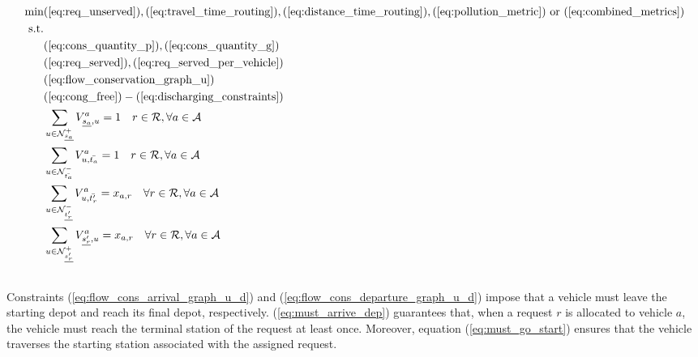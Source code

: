 \begin{align}
	\text{min}&  
		(\ref{eq:req_unserved}),
		(\ref{eq:travel_time_routing}), (\ref{eq:distance_time_routing}), (\ref{eq:pollution_metric}) \text{ or } (\ref{eq:combined_metrics})
	\nonumber\\
	\text{s.t.} &\nonumber\\
	&(\ref{eq:cons_quantity_p}),(\ref{eq:cons_quantity_g})\nonumber\\	
	&(\ref{eq:req_served}),(\ref{eq:req_served_per_vehicle})\nonumber\\	
	&(\ref{eq:flow_conservation_graph_u})\nonumber\\%
	&(\ref{eq:cong_free})-(\ref{eq:discharging_constraints})\nonumber\\
	&\sum_{ u \in \mathcal{N}^+_{\underline{s_a}} }V^a_{ \underline{s_a},u} = 1 \quad r \in \mathcal{R},  \forall a \in \mathcal{A} \label{eq:flow_cons_arrival_graph_u_d}\\
	&\sum_{u \in \mathcal{N}^-_{\bar{t_a}} } V^a_{u, \bar{t_a}} = 1 \quad r \in \mathcal{R},  \forall a \in \mathcal{A} \label{eq:flow_cons_departure_graph_u_d}\\
	&\sum_{u \in \mathcal{N}^-_{\underline{t'_r}} } V^a_{u, \bar{t'_r}} = x_{a,r} \quad  \forall r \in \mathcal{R}, \forall a \in \mathcal{A} \label{eq:must_arrive_dep}	\\
	&\sum_{u \in \mathcal{N}^+_{\underline{s'_r}} } V^a_{ \underline{s'_r}, u} = x_{a,r} \quad   \forall r \in \mathcal{R}, \forall a \in \mathcal{A}\label{eq:must_go_start}\\
	\nonumber
\end{align}
Constraints (\ref{eq:flow_cons_arrival_graph_u_d}) and (\ref{eq:flow_cons_departure_graph_u_d}) impose that a vehicle must leave the starting depot and reach its final depot, respectively.  (\ref{eq:must_arrive_dep}) guarantees that, when a request $r$ is allocated to vehicle $a$, the vehicle must reach the terminal station of the request at least once. Moreover, equation (\ref{eq:must_go_start}) ensures that the vehicle traverses the starting station associated with the assigned request. \\
